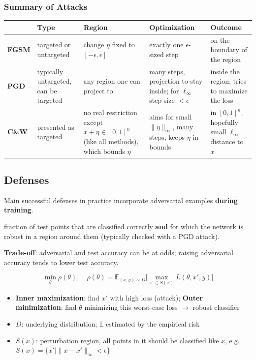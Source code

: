 \subsubsection{Summary of Attacks}
{\footnotesize
\setlength{\tabcolsep}{3pt}
\renewcommand{\arraystretch}{1.15}
\noindent\begin{tabular}{@{}>{\raggedright\arraybackslash}p{0.8cm}YYYY@{}}
\hline
 & \textbf{Type} & \textbf{Region} & \textbf{Optimiz\-ation} & \textbf{Outcome} \\
\hline
\textbf{FGSM} & targeted or untargeted & change $\eta$ fixed to $[-\epsilon,\epsilon]$
  & exactly one $\epsilon$-sized step & on the boundary of the region \\
\hline
\textbf{PGD} & typically untargeted, can be targeted & any region one can project to
  & many steps, projection to stay inside; for $\ell_\infty$ step size $< \epsilon$
  & inside the region; tries to maximize the loss \\
\hline
\textbf{C\&W} & presented as targeted
  & no real restriction except $x + \eta \in [0,1]^n$ (like all methods), which bounds $\eta$
  & aims for small $\|\eta\|_\infty$, many steps, keeps $\eta$ in bounds
  & in $[0,1]^n$, hopefully small $\ell_\infty$ distance to $x$ \\
\hline
\end{tabular}\par}

\subsection{Defenses}
Main successful defenses in practice incorporate adversarial examples \textbf{during training}.

 fraction of test points that are classified correctly \textbf{and} for which
the network is robust in a region around them (typically checked with a PGD attack).


\textbf{Trade-off}: adversarial and test accuracy can be at odds; raising adversarial accuracy tends to lower
test accuracy.

\[
  \min_\theta \rho(\theta), \quad \rho(\theta) = \mathbb{E}_{(x,y)\sim D}\Big[\max_{x' \in S(x)} L(\theta, x', y)\Big]
\]
\begin{itemize}
  \item \textbf{Inner maximization}: find $x'$ with high loss (attack);
    \textbf{Outer minimization}: find $\theta$ minimizing this worst-case loss $\to$ robust classifier
  \item $D$: underlying distribution; $\mathbb{E}$ estimated by the empirical risk
  \item $S(x)$: perturbation region, all points in it should be classified like $x$, e.g.\
    $S(x) = \{x' \mid \|x - x'\|_\infty < \epsilon\}$
\end{itemize}

